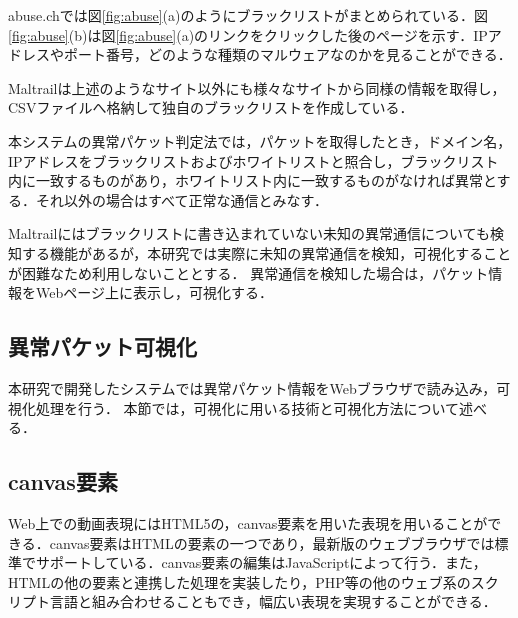 \documentclass{thesis}
\begin{document}
abuse.chでは図\ref{fig:abuse}(a)のようにブラックリストがまとめられている．図\ref{fig:abuse}(b)は図\ref{fig:abuse}(a)のリンクをクリックした後のページを示す．IPアドレスやポート番号，どのような種類のマルウェアなのかを見ることができる．

\vspace{0.2in}
Maltrailは上述のようなサイト以外にも様々なサイトから同様の情報を取得し，CSVファイルへ格納して独自のブラックリストを作成している．

本システムの異常パケット判定法では，パケットを取得したとき，ドメイン名，IPアドレスをブラックリストおよびホワイトリストと照合し，ブラックリスト内に一致するものがあり，ホワイトリスト内に一致するものがなければ異常とする．それ以外の場合はすべて正常な通信とみなす．%


Maltrailにはブラックリストに書き込まれていない未知の異常通信についても検知する機能があるが，本研究では実際に未知の異常通信を検知，可視化することが困難なため利用しないこととする．
異常通信を検知した場合は，パケット情報をWebページ上に表示し，可視化する．

\subsection{異常パケット可視化} \label{sec:異常パケット可視化}

本研究で開発したシステムでは異常パケット情報をWebブラウザで読み込み，可視化処理を行う．
本節では，可視化に用いる技術と可視化方法について述べる．

\subsection*{canvas要素}
Web上での動画表現にはHTML5の，canvas要素を用いた表現を用いることができる．canvas要素はHTMLの要素の一つであり，最新版のウェブブラウザでは標準でサポートしている．canvas要素の編集はJavaScriptによって行う．また，HTMLの他の要素と連携した処理を実装したり，PHP等の他のウェブ系のスクリプト言語と組み合わせることもでき，幅広い表現を実現することができる．
\end{document}
